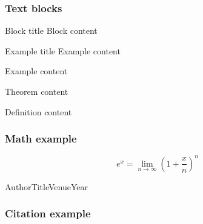 \documentclass[aspectratio=169]{beamer}
\begin{document}
\begin{frame}
  \frametitle{Text blocks}
  
  \begin{block}{Block title}
    Block content
  \end{block}

  \begin{exampleblock}{Example title}
    Example content
  \end{exampleblock}

  \begin{example}
    Example content
  \end{example}

  \begin{theorem}
    Theorem content
  \end{theorem}

  \begin{definition}
    Definition content
  \end{definition}
\end{frame}

\begin{frame}
  \frametitle{Math example}
  \begin{equation}
    e^x = \lim_{n \to \infty}\left(1 + \frac{x}{n}\right)^n
  \end{equation}
\end{frame}

\begin{citeframe}{Author}{Title}{Venue}{Year}
  \frametitle{Citation example}
\end{citeframe}
\end{document}
